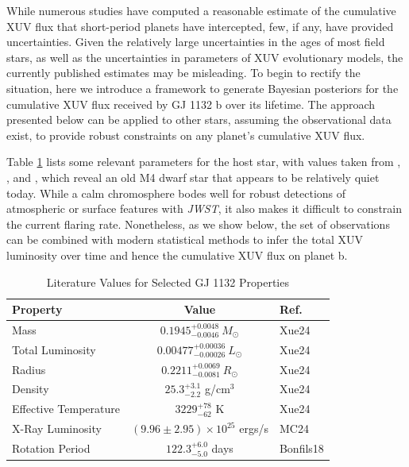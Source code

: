 \documentclass[preprint]{aastex631}
\def\jwst{{\it JWST}\xspace}
\def\msun{{M_\odot}}
\def\rsun{{R_\odot}}
\def\lsun{{L_\odot}}
\begin{document}
While numerous studies have computed a reasonable estimate of the cumulative XUV flux that short-period planets have intercepted, few, if any, have provided uncertainties. Given the relatively large uncertainties in the ages of most field stars, as well as the uncertainties in parameters of XUV evolutionary models, the currently published estimates may be misleading. To begin to rectify the situation, here we introduce a framework to generate Bayesian posteriors for the cumulative XUV flux received by GJ 1132 b over its lifetime. The approach presented below can be applied to other stars, assuming the observational data exist, to provide robust constraints on any planet's cumulative XUV flux.

Table \ref{tab:starprops} lists some relevant parameters for the host star, with values taken from \citet[][hereafter Xue24]{Xue2024}, \citet[][hereafter MC24]{MoralesCalderon2024}, and \citet[][hereafter Bonfils18]{Bonfils2018}, which reveal an old M4 dwarf star that appears to be relatively quiet today. While a calm chromosphere bodes well for robust detections of atmospheric or surface features with \jwst, it also makes it difficult to constrain the current flaring rate. Nonetheless, as we show below, the set of observations can be combined with modern statistical methods to infer the total XUV luminosity over time and hence the cumulative XUV flux on planet b.

\begin{table}
\centering
\caption{Literature Values for Selected GJ 1132 Properties}
\begin{tabular}{lcl}
\hline\hline
Property & Value & Ref.\\
\hline
Mass & $0.1945^{+0.0048}_{-0.0046}~\msun$ & Xue24\\
Total Luminosity & $0.00477^{+0.00036}_{-0.00026}~\lsun$ & Xue24\\
Radius & $0.2211^{+0.0069}_{-0.0081}~\rsun$ & Xue24\\
Density & $25.3^{+3.1}_{-2.2}$ g/cm$^3$ & Xue24\\
Effective Temperature & $3229^{+78}_{-62}$ K & Xue24\\
X-Ray Luminosity & $(9.96\pm2.95) \times 10^{25}$ ergs/s & MC24\\
Rotation Period & $122.3^{+6.0}_{-5.0}$ days & Bonfils18\\
\hline
\end{tabular}
\label{tab:starprops}
\end{table}
\end{document}
